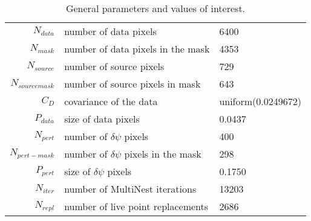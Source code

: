 \begin{table*}[!htb]\caption{General parameters and values of interest.}\begin{center}\begin{tabular}{ r l l }\hline $N_{data}$        & number of data pixels             & 6400 \\ 
 $N_{mask}$        & number of data pixels in the mask & 4353 \\ 
 $N_{source}$      & number of source pixels           & 729 \\ 
 $N_{source mask}$ & number of source pixels in mask   & 643 \\ 
 $C_D$        & covariance of the data            & uniform(0.0249672) \\ 
 $P_{data}$   & size of data pixels               &     0.0437 \\ 
\hline  $N_{pert}$       & number of $\delta\psi$ pixels             & 400 \\ 
 $N_{pert-mask}$  & number of $\delta\psi$ pixels in the mask & 298 \\ 
 $P_{pert}$       & size of $\delta\psi$ pixels               &     0.1750 \\ 
 $N_{iter}$   & number of MultiNest iterations    & 13203 \\ 
 $N_{repl}$   & number of live point replacements & 2686 \\ 
\hline\end{tabular}\end{center}\label{tab:3}\end{table*}